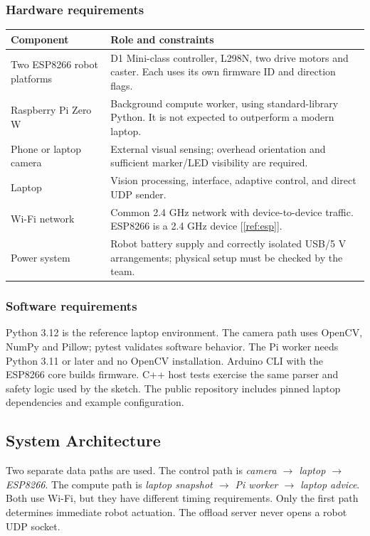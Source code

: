 \documentclass[11pt,a4paper]{article}
\newcommand{\citesrc}[1]{[\ref{ref:#1}]}
\begin{document}
\subsubsection*{Hardware requirements}
\begin{tabularx}{\textwidth}{@{}lY@{}}\toprule
Component & Role and constraints\\\midrule
Two ESP8266 robot platforms & D1 Mini-class controller, L298N, two drive motors and caster. Each uses its own firmware ID and direction flags.\\
Raspberry Pi Zero W & Background compute worker, using standard-library Python. It is not expected to outperform a modern laptop.\\
Phone or laptop camera & External visual sensing; overhead orientation and sufficient marker/LED visibility are required.\\
Laptop & Vision processing, interface, adaptive control, and direct UDP sender.\\
Wi-Fi network & Common 2.4 GHz network with device-to-device traffic. ESP8266 is a 2.4 GHz device \citesrc{esp}.\\
Power system & Robot battery supply and correctly isolated USB/5 V arrangements; physical setup must be checked by the team.\\\bottomrule
\end{tabularx}

\subsubsection*{Software requirements}
Python 3.12 is the reference laptop environment. The camera path uses OpenCV,
NumPy and Pillow; pytest validates software behavior. The Pi worker needs Python
3.11 or later and no OpenCV installation. Arduino CLI with the ESP8266 core builds
firmware. C++ host tests exercise the same parser and safety logic used by the sketch.
The public repository includes pinned laptop dependencies and example configuration.

\subsection{System Architecture}
Two separate data paths are used. The control path is
\textit{camera $\rightarrow$ laptop $\rightarrow$ ESP8266}. The compute path is
\textit{laptop snapshot $\rightarrow$ Pi worker $\rightarrow$ laptop advice}.
Both use Wi-Fi, but they have different timing requirements. Only the first path
determines immediate robot actuation. The offload server never opens a robot UDP socket.
\end{document}
